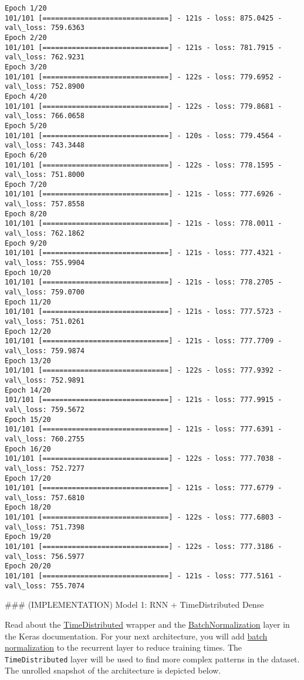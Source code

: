 \documentclass[11pt]{article}
\begin{document}
    \begin{Verbatim}[commandchars=\\\{\}]
Epoch 1/20
101/101 [==============================] - 121s - loss: 875.0425 - val\_loss: 759.6363
Epoch 2/20
101/101 [==============================] - 121s - loss: 781.7915 - val\_loss: 762.9231
Epoch 3/20
101/101 [==============================] - 122s - loss: 779.6952 - val\_loss: 752.8900
Epoch 4/20
101/101 [==============================] - 122s - loss: 779.8681 - val\_loss: 766.0658
Epoch 5/20
101/101 [==============================] - 120s - loss: 779.4564 - val\_loss: 743.3448
Epoch 6/20
101/101 [==============================] - 122s - loss: 778.1595 - val\_loss: 751.8000
Epoch 7/20
101/101 [==============================] - 121s - loss: 777.6926 - val\_loss: 757.8558
Epoch 8/20
101/101 [==============================] - 121s - loss: 778.0011 - val\_loss: 762.1862
Epoch 9/20
101/101 [==============================] - 121s - loss: 777.4321 - val\_loss: 755.9904
Epoch 10/20
101/101 [==============================] - 121s - loss: 778.2705 - val\_loss: 759.0700
Epoch 11/20
101/101 [==============================] - 121s - loss: 777.5723 - val\_loss: 751.0261
Epoch 12/20
101/101 [==============================] - 121s - loss: 777.7709 - val\_loss: 759.9874
Epoch 13/20
101/101 [==============================] - 122s - loss: 777.9392 - val\_loss: 752.9891
Epoch 14/20
101/101 [==============================] - 121s - loss: 777.9915 - val\_loss: 759.5672
Epoch 15/20
101/101 [==============================] - 121s - loss: 777.6391 - val\_loss: 760.2755
Epoch 16/20
101/101 [==============================] - 122s - loss: 777.7038 - val\_loss: 752.7277
Epoch 17/20
101/101 [==============================] - 121s - loss: 777.6779 - val\_loss: 757.6810
Epoch 18/20
101/101 [==============================] - 122s - loss: 777.6803 - val\_loss: 751.7398
Epoch 19/20
101/101 [==============================] - 122s - loss: 777.3186 - val\_loss: 756.5977
Epoch 20/20
101/101 [==============================] - 121s - loss: 777.5161 - val\_loss: 755.7074

    \end{Verbatim}

     \#\#\# (IMPLEMENTATION) Model 1: RNN + TimeDistributed Dense

Read about the \href{https://keras.io/layers/wrappers/}{TimeDistributed}
wrapper and the
\href{https://keras.io/layers/normalization/}{BatchNormalization} layer
in the Keras documentation. For your next architecture, you will add
\href{https://arxiv.org/pdf/1510.01378.pdf}{batch normalization} to the
recurrent layer to reduce training times. The \texttt{TimeDistributed}
layer will be used to find more complex patterns in the dataset. The
unrolled snapshot of the architecture is depicted below.
\end{document}
